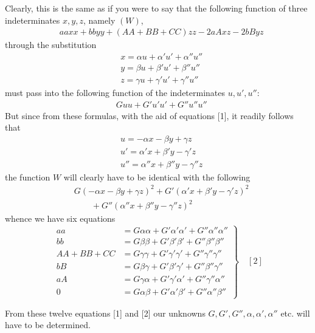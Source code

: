 Clearly, this is the same as if you were to say that the following function of three indeterminates $x,y,z$, namely $(W)$,
\[
\begin{aligned}
&aaxx+bbyy+(AA+BB+CC)zz-2aAxz-2bByz
\end{aligned}
\]
through the substitution
\[
\begin{aligned}
&x=\alpha u+\alpha'u'+\alpha''u''\\[6pt]
&y=\beta u+\beta'u'+\beta''u''\\[6pt]
&z=\gamma u+\gamma'u'+\gamma''u''
\end{aligned}
\]
must pass into the following function of the indeterminates $u,u',u''$:
\[
\begin{aligned}
&Guu+G'u'u'+G''u''u''
\end{aligned}
\]
But since from these formulas, with the aid of equations [1], it readily follows that
\[
\begin{aligned}
&u=-\alpha x-\beta y+\gamma z\\[6pt]
&u'=\alpha'x+\beta'y-\gamma'z\\[6pt]
&u''=\alpha''x+\beta''y-\gamma''z
\end{aligned}
\]
the function $W$ will clearly have to be identical with the following
\[
\begin{aligned}
&G(-\alpha x-\beta y+\gamma z)^2
+G'(\alpha'x+\beta'y-\gamma'z)^2
\\[6pt]
&\qquad{}+G''(\alpha''x+\beta''y-\gamma''z)^2
\end{aligned}
\]
whence we have six equations
\[
\left.
\begin{aligned}
aa&=G\alpha\alpha+G'\alpha'\alpha'+G''\alpha''\alpha''\\[5pt]
bb&=G\beta\beta+G'\beta'\beta'+G''\beta''\beta''\\[5pt]
AA+BB+CC&=G\gamma\gamma+G'\gamma'\gamma'+G''\gamma''\gamma''\\[5pt]
bB&=G\beta\gamma+G'\beta'\gamma'+G''\beta''\gamma''\\[5pt]
aA&=G\gamma\alpha+G'\gamma'\alpha'+G''\gamma''\alpha''\\[5pt]
0&=G\alpha\beta+G'\alpha'\beta'+G''\alpha''\beta''
\end{aligned}
\right\}\quad [2]
\]

From these twelve equations [1] and [2] our unknowns $G,\allowbreak G',\allowbreak G'',\allowbreak \alpha,\allowbreak \alpha',\allowbreak \alpha''$ etc. will have to be determined.

